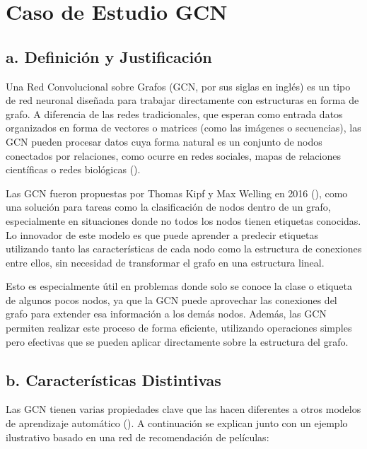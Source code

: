 \documentclass[11pt]{article} %
\begin{document}
\section{Caso de Estudio GCN} \vspace{10pt}

\subsection{a. Definición y Justificación}

Una Red Convolucional sobre Grafos (GCN, por sus siglas en inglés) es un tipo de red neuronal diseñada para trabajar directamente con estructuras en forma de grafo. A diferencia de las redes tradicionales, que esperan como entrada datos organizados en forma de vectores o matrices (como las imágenes o secuencias), las GCN pueden procesar datos cuya forma natural es un conjunto de nodos conectados por relaciones, como ocurre en redes sociales, mapas de relaciones científicas o redes biológicas (\cite{zhou2020graph, bronstein2017geometric}).

Las GCN fueron propuestas por Thomas Kipf y Max Welling en 2016 (\cite{kipf2016semi}), como una solución para tareas como la clasificación de nodos dentro de un grafo, especialmente en situaciones donde no todos los nodos tienen etiquetas conocidas. Lo innovador de este modelo es que puede aprender a predecir etiquetas utilizando tanto las características de cada nodo como la estructura de conexiones entre ellos, sin necesidad de transformar el grafo en una estructura lineal.

Esto es especialmente útil en problemas donde solo se conoce la clase o etiqueta de algunos pocos nodos, ya que la GCN puede aprovechar las conexiones del grafo para extender esa información a los demás nodos. Además, las GCN permiten realizar este proceso de forma eficiente, utilizando operaciones simples pero efectivas que se pueden aplicar directamente sobre la estructura del grafo.
\subsection{b. Características Distintivas}

Las GCN tienen varias propiedades clave que las hacen diferentes a otros modelos de aprendizaje automático (\cite{wu2020comprehensive}). A continuación se explican junto con un ejemplo ilustrativo basado en una red de recomendación de películas:
\end{document}
